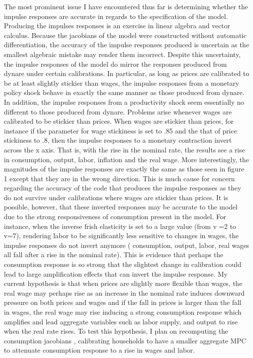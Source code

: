 \documentclass[titlepage]{\econtex}\providecommand{\texname}{BufferStockTheory}
\begin{document}
The most prominent issue I have encountered thus far is determining whether the impulse responses are accurate in regards to the specification of the model. Producing the impulses responses is an exercise in linear algebra and vector calculus. Because the jacobians of the model were constructed without automatic differentiation, the accuracy of the impulse responses produced is uncertain as the smallest algebraic mistake may render them incorrect. Despite this uncertainty, the impulse responses of the model do mirror the responses produced from dynare under certain calibrations.  In particular, as long as prices are calibrated to be at least slightly stickier than wages, the impulse responses from a monetary policy shock behave in exactly the same manner as those produced from dynare. In addition, the impulse responses from a productivity shock seem essentially no different to those produced from dynare. Problems arise whenever wages are calibrated to be stickier than prices. When wages are stickier than prices,  for instance if the parameter for wage stickiness is set to .85 and the that of price stickiness to .8, then the impulse responses to a monetary contraction invert across the x axis. That is, with the rise in the nominal rate, the results see a rise in consumption, output, labor, inflation and the real wage. More interestingly, the magnitudes of the impulse responses are exactly the same as those seen in figure 1 except that they are in the wrong direction. This is much cause for concern regarding the accuracy of the code that produces the impulse responses as they do not survive under calibrations where wages are stickier than prices. It is possible, however, that these inverted responses may be accurate to the model due to the strong responsiveness of consumption present in the model. For instance, when the inverse frish elasticity is set to a large value (from v =2 to v=7), rendering labor to be significantly less sensitive to changes in wages, the impulse responses do not invert anymore ( consumption, output, labor, real wages all fall after a rise in the nominal rate). This is evidence that perhaps the consumption response is so strong that the slightest change in calibration could lead to large amplification effects that can invert the impulse response. My current hypothesis is that when prices are slightly more flexible than wages, the real wage may perhaps rise as  an increase in the nominal rate induces downward pressure on both prices and wages and if the fall in prices is larger than the fall in wages, the real wage may rise inducing a strong consumption response which amplifies and lead aggregate variables such as labor supply, and output to rise when the real rate rises. To test this hypothesis, I plan on recomputing the consumption jacobians , calibrating households to have a smaller aggregate MPC to attenuate consumption response to a rise in wages and labor.
\end{document}
